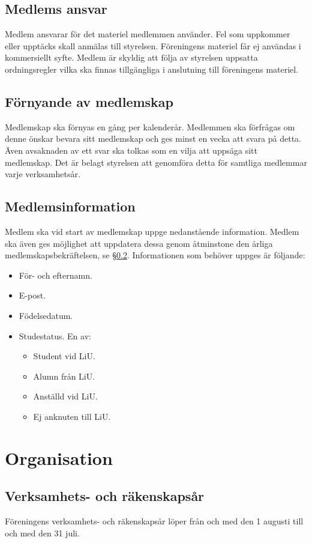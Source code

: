 \documentclass[11pt,a4paper]{article}
\begin{document}
\subsection{Medlems ansvar}
Medlem ansvarar för det materiel medlemmen använder. Fel som uppkommer eller upptäcks skall anmälas till styrelsen. Föreningens materiel får ej användas i kommersiellt syfte. Medlem är skyldig att följa av styrelsen uppsatta ordningsregler vilka ska finnas
tillgängliga i anslutning till föreningens materiel.
\subsection{Förnyande av medlemskap }
\label{sec:förnyande}
Medlemskap ska förnyas en gång per kalenderår. Medlemmen ska förfrågas om denne önskar bevara sitt medlemskap och ges minst en vecka att svara på detta. Även avsaknaden av ett svar ska tolkas som en vilja att uppsäga sitt medlemskap. Det är belagt styrelsen att genomföra detta för samtliga medlemmar varje verksamhetsår.
\subsection{Medlemsinformation}
Medlem ska vid start av medlemskap uppge nedanstående information. Medlem ska även ges möjlighet att uppdatera dessa genom åtminstone den årliga medlemskapsbekräftelsen, se §\ref{sec:förnyande}. \bigskip
Informationen som behöver uppges är följande:
\begin{itemize}
    \item För- och efternamn.
    \item E-post.
    \item Födelsedatum.
    \item Studestatus. En av:
    \begin{itemize}
        \item Student vid LiU.
        \item Alumn från LiU.
        \item Anställd vid LiU.
        \item Ej anknuten till LiU. 
    \end{itemize}
\end{itemize}

\section{Organisation}

\subsection{Verksamhets- och räkenskapsår}
Föreningens verksamhets- och räkenskapsår löper från och med den 1
augusti till och med den 31 juli.
\end{document}
